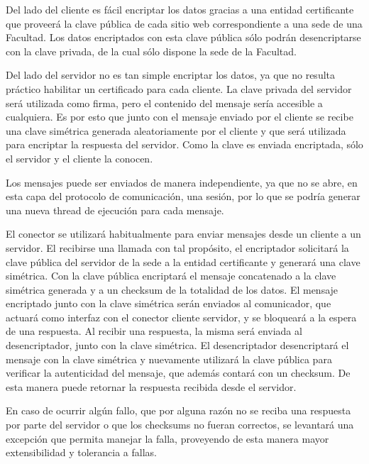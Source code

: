 Del lado del cliente es fácil encriptar los datos gracias a una entidad certificante que proveerá la clave pública de cada sitio web correspondiente a una sede de una Facultad. Los datos encriptados con esta clave pública sólo podrán desencriptarse con la clave privada, de la cual sólo dispone la sede de la Facultad.


Del lado del servidor no es tan simple encriptar los datos, ya que no resulta práctico habilitar un certificado para cada cliente. La clave privada del servidor será utilizada como firma, pero el contenido del mensaje sería accesible a cualquiera.
Es por esto que junto con el mensaje enviado por el cliente se recibe una clave simétrica generada aleatoriamente por el cliente y que será utilizada para encriptar la respuesta del servidor. Como la clave es enviada encriptada, sólo el servidor y el cliente la conocen.


Los mensajes puede ser enviados de manera independiente, ya que no se abre, en esta capa del protocolo de comunicación, una sesión, por lo que se podría generar una nueva thread de ejecución para cada mensaje. 

El conector se utilizará habitualmente para enviar mensajes desde un cliente a un servidor. El recibirse una llamada con tal propósito, el encriptador solicitará la clave pública del servidor de la sede a la entidad certificante y generará una clave simétrica. Con la clave pública encriptará el mensaje concatenado a la clave simétrica generada y a un checksum de la totalidad de los datos. El mensaje encriptado junto con la clave simétrica serán enviados al comunicador, que actuará como interfaz con el conector cliente servidor, y se bloqueará a la espera de una respuesta. Al recibir una respuesta, la misma será enviada al desencriptador, junto con la clave simétrica. El desencriptador desencriptará el mensaje con la clave simétrica y nuevamente utilizará la clave pública para verificar la autenticidad del mensaje, que además contará con un checksum. De esta manera puede retornar la respuesta recibida desde el servidor.


En caso de ocurrir algún fallo, que por alguna razón no se reciba una respuesta por parte del servidor o que los checksums no fueran correctos, se levantará una excepción que permita manejar la falla, proveyendo de esta manera mayor extensibilidad y tolerancia a fallas.





